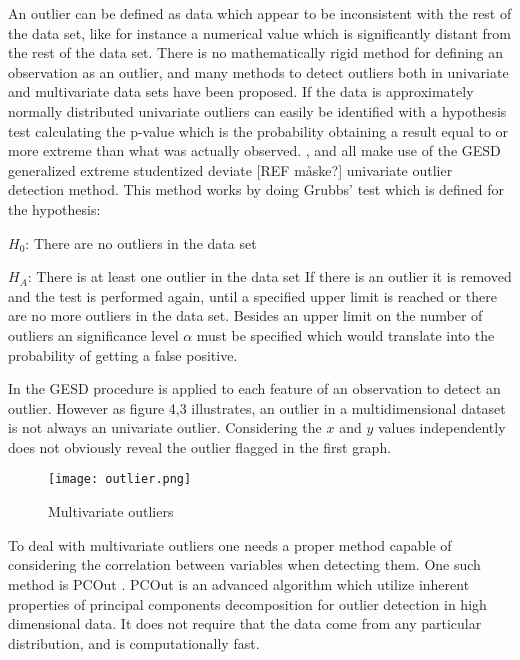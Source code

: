 An outlier can be defined as data which appear to be inconsistent with the rest of the data set, like for instance a numerical value which is significantly distant from the rest of the data set. There is no mathematically rigid method for defining an observation as an outlier, and many methods to detect outliers both in univariate and multivariate data sets have been proposed. If the data is approximately normally distributed univariate outliers can easily be identified with a hypothesis test calculating the p-value which is the probability obtaining a result equal to or more extreme than what was actually observed. \cite{faultdetec2}, \cite{faultdetec3} and \cite{faultdetec4} all make use of the GESD generalized extreme studentized deviate [REF måske?] univariate outlier detection method. This method works by doing Grubbs’ test which is defined for the hypothesis:
\newline

$H_0$: There are no outliers in the data set
\newline

$H_A$: There is at least one outlier in the data set 
\newline
\newline
If there is an outlier it is removed and the test is performed again, until a specified upper limit is reached or there are no more outliers in the data set. Besides an upper limit on the number of outliers an significance level $\alpha$ must be specified which would translate into the probability of getting a false positive. 

In \cite{faultdetec2} the GESD procedure is applied to each feature of an observation to detect an outlier. However as figure 4,3 illustrates, an outlier in a multidimensional dataset is not always an univariate outlier. Considering the $x$ and $y$ values independently does not obviously reveal the outlier flagged in the first graph. 
\begin{figure}
\texttt{[image: outlier.png]}
\caption{Multivariate outliers}
\end{figure}
To deal with multivariate outliers one needs a proper method capable of considering the correlation between variables when detecting them. One such method is PCOut \cite{OutDetec1}. PCOut is an advanced algorithm which utilize inherent properties of principal components decomposition for outlier detection in high dimensional data. It does not require that the data come from any particular distribution, and is computationally fast.
